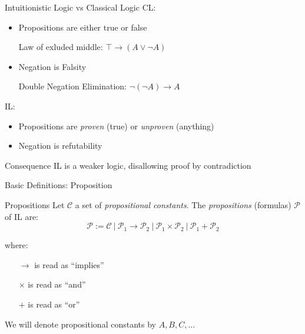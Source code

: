 \documentclass{beamer}
\begin{document}
\begin{frame}{Intuitionistic Logic vs Classical Logic}
	\alert{CL}:
	\begin{itemize}
		\item Propositions are either true or false
		\item[] \quad 
			\small{\alert{Law of exluded middle}:
				$\top \to (A \vee \neg A)$
			}
		\item Negation is Falsity
		\item[] \quad 
			\small{\alert{Double Negation Elimination}:
				$\neg (\neg A) \to A$
			}
	\end{itemize}
	\vfill
	
	\alert{IL}:
	\begin{itemize}
		\item Propositions are \textit{proven} (true) or \textit{unproven} (anything)
		\item Negation is refutability
	\end{itemize}
	\vfill
	
	\begin{block}{Consequence}
		IL is a \alert{weaker} logic, disallowing proof by contradiction
	\end{block}	
	
\end{frame}

%

\begin{frame}{Basic Definitions: Proposition}

	\begin{block}{Propositions}
		Let $\mathcal{C}$ a set of \textit{propositional constants}.
		The \textit{propositions} (formulas) $\mathcal{P}$ of IL are:
		\[
		\mathcal{P} := \mathcal{C}  \ | \ \mathcal{P}_1 \to \mathcal{P}_2 \ | \ \mathcal{P}_1 \times \mathcal{P}_2 \
		| \ \mathcal{P}_1 + \mathcal{P}_2
		\]
	
	where:
	\begin{itemize}
		\item[$\to$] is read as ``implies''
		\item[$\times$] is read as ``and''
		\item[$+$] is read as ``or''
	\end{itemize}
	\end{block}
	
	\begin{flushright}
		\small
		We will denote propositional constants by $A, B, C, \dots$
	\end{flushright}
\end{frame}
\end{document}
